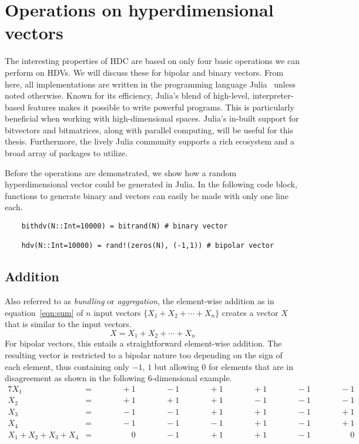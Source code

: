 \section{Operations on hyperdimensional vectors}
The interesting properties of HDC are based on only four basic operations we can perform on HDVs. We will discuss these for bipolar and binary vectors. From here, all implementations are written in the programming language Julia~\cite{Julia} unless noted otherwise. Known for its efficiency, Julia's blend of high-level, interpreter-based features makes it possible to write powerful programs. This is particularly beneficial when working with high-dimensional spaces. Julia's in-built support for bitvectors and bitmatrices, along with parallel computing, will be useful for this thesis. Furthermore, the lively Julia community supports a rich ecosystem and a broad array of packages to utilize.

Before the operations are demonstrated, we show how a random hyperdimensional vector could be generated in Julia. In the following code block, functions to generate binary and vectors can easily be made with only one line each.

\begin{verbatim}
    bithdv(N::Int=10000) = bitrand(N) # binary vector

    hdv(N::Int=10000) = rand!(zeros(N), (-1,1)) # bipolar vector
\end{verbatim}

\subsection*{Addition} \label{sssec:add}
Also referred to as \textit{bundling} or \textit{aggregation}, the element-wise addition as in equation~\ref{eqn:sum} of $n$ input vectors $\{X_{1} + X_{2} + \cdots + X_{n}\}$ creates a vector $X$ that is similar to the input vectors.
\begin{equation}
    \label{eqn:sum}
    X = X_{1} + X_{2} + \cdots + X_{n}
\end{equation}
For bipolar vectors, this entails a straightforward element-wise addition. The resulting vector is restricted to a bipolar nature too depending on the sign of each element, thus containing only $-1$, $1$ but allowing $0$ for elements that are in disagreement as shown in the following $6$-dimensional example.
\begin{alignat*}{7}
    X_{1} &= && \qquad +1 && \qquad -1 && \qquad +1 && \qquad +1 && \qquad -1 && \qquad -1 \\
    X_{2} &= && \qquad +1 && \qquad +1 && \qquad +1 && \qquad -1 && \qquad -1 && \qquad -1 \\
    X_{3} &= && \qquad -1 && \qquad -1 && \qquad +1 && \qquad +1 && \qquad -1 && \qquad +1 \\
    X_{4} &= && \qquad -1 && \qquad -1 && \qquad -1 && \qquad +1 && \qquad -1 && \qquad +1 \\
    \hline
    X_{1} + X_{2} + X_{3} + X_{4} &= && \qquad \phantom{-}0 && \qquad -1 && \qquad +1 && \qquad +1 && \qquad -1 && \qquad \phantom{-}0
\end{alignat*}

